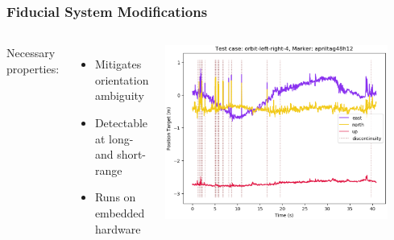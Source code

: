 \documentclass[aspectratio=169]{rubeamer}
\newcommand{\nologo}{\setbeamertemplate{logo}{}}
\newif\ifpause
\newcommand{\mypause}{\ifpause \pause \fi}
\begin{document}
\nologo
\begin{frame}
  \frametitle{Fiducial System Modifications}
  \begin{columns}

    Necessary properties:
    \begin{itemize}
      \item Mitigates orientation ambiguity
      \mypause
      \item Detectable at long- and short-range
      \mypause
      \item Runs on embedded hardware
    \end{itemize}
    \centering
    \onslide
    \includegraphics[width=0.9\textwidth]{orbit-left-right-4_apriltag48h12_position-target}
  \end{columns}
\end{frame}

\ifpause
\end{document}
